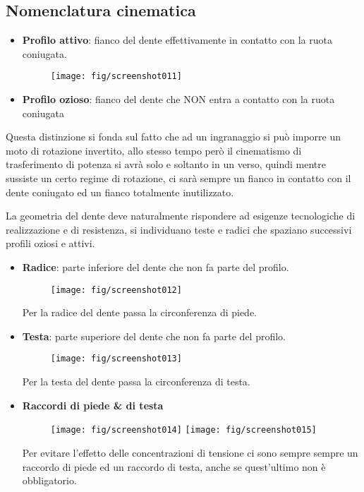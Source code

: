 \documentclass[a4paper, 15pt]{article}
\begin{document}
\subsection{Nomenclatura cinematica}
\begin{adjustwidth}{2in}{}
	\begin{itemize}
		\item \textbf{Profilo attivo}: fianco del dente effettivamente in contatto con la ruota coniugata.
		\begin{figure}[H]
			\centering
			\texttt{[image: fig/screenshot011]}
			\label{fig:screenshot011}
		\end{figure}
		\item \textbf{Profilo ozioso}: fianco del dente che NON entra a contatto con la ruota coniugata		
		\end{itemize}
		Questa distinzione si fonda sul fatto che ad un ingranaggio si può imporre un moto di rotazione invertito, allo stesso tempo però il cinematismo di trasferimento di potenza si avrà solo e soltanto in un verso, quindi mentre sussiste un certo regime di rotazione, ci sarà sempre un fianco in contatto con il dente coniugato ed un fianco totalmente inutilizzato. \newline 
		
		La geometria del dente deve naturalmente rispondere ad esigenze tecnologiche di realizzazione e di resistenza, si individuano teste e radici che spaziano successivi profili oziosi e attivi.	
		\begin{itemize}
			\item \textbf{Radice}: parte inferiore del dente che non fa parte del profilo.
			\begin{figure}[H]
				\centering
				\texttt{[image: fig/screenshot012]}
				\label{fig:screenshot012}
			\end{figure}
			Per la radice del dente passa la circonferenza di piede.
\newpage
			\item \textbf{Testa}: parte superiore del dente che non fa parte del profilo.
			\begin{figure}[H]
				\centering
				\texttt{[image: fig/screenshot013]}
				\label{fig:screenshot013}
			\end{figure}			
			Per la testa del dente passa la circonferenza di testa.
			
			\item \textbf{Raccordi di piede \& di testa}
			\begin{figure}[H]
				\centering
				\texttt{[image: fig/screenshot014]}
				\texttt{[image: fig/screenshot015]}
				\label{fig:screenshot014}
			\end{figure}			
			Per evitare l'effetto delle concentrazioni di tensione ci sono sempre sempre un raccordo di piede ed un raccordo di testa, anche se quest'ultimo non è obbligatorio.			
		\end{itemize}
		

\end{adjustwidth}
\end{document}
